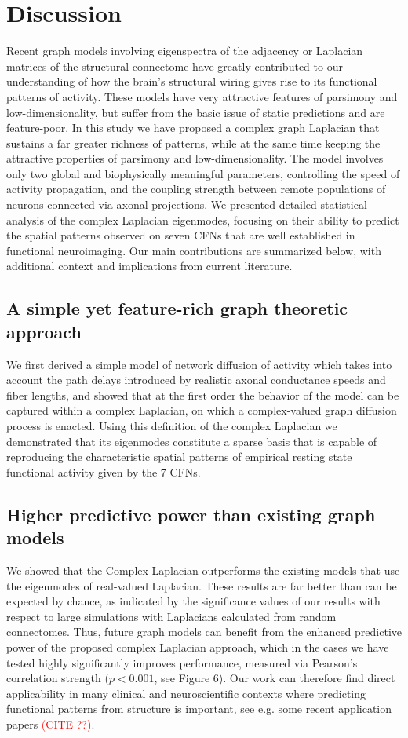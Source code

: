 \documentclass{article}
\begin{document}
\section{Discussion}

Recent graph models involving eigenspectra of the adjacency or Laplacian matrices of the structural connectome have greatly contributed to our understanding of how the brain's structural wiring gives rise to its functional patterns of activity. These models have very attractive features of parsimony and low-dimensionality, but suffer from the basic issue of static predictions and are feature-poor. In this study we have proposed a complex graph Laplacian that sustains a far greater richness of patterns, while at the same time keeping the attractive properties of parsimony and low-dimensionality. The model involves only two global and biophysically meaningful parameters, controlling the speed of activity propagation, and the coupling strength between remote populations of neurons connected via axonal projections. We presented detailed statistical analysis of the complex Laplacian eigenmodes, focusing on their ability to predict the spatial patterns observed on seven CFNs that are well established in functional neuroimaging. Our main contributions are summarized below, with additional context and implications from current literature.

\subsection{A simple yet feature-rich graph theoretic approach }
We first derived a simple model of network diffusion of activity which takes into account the path delays introduced by realistic axonal conductance speeds and fiber lengths, and showed that at the first order the behavior of the model can be captured within a complex Laplacian, on which a complex-valued graph diffusion process is enacted. Using this definition of the complex Laplacian we demonstrated that its eigenmodes constitute a sparse basis that is capable of reproducing the characteristic spatial patterns of empirical resting state functional activity given by the 7 CFNs.

\subsection{Higher predictive power than existing graph models}
We showed that the Complex Laplacian outperforms the existing models that use the eigenmodes of real-valued Laplacian. These results are far better than can be expected by chance, as indicated by the significance values of our results with respect to large simulations with Laplacians calculated from random connectomes. Thus, future graph models can benefit from the enhanced predictive power of the proposed complex Laplacian approach, which in the cases we have tested highly significantly improves performance, measured via Pearson's correlation strength ($p<0.001$, see Figure 6). Our work can therefore find direct applicability in many clinical and neuroscientific contexts where predicting functional patterns from structure is important, see e.g. some recent application papers \textcolor{red}{(CITE ??)}.
\end{document}
